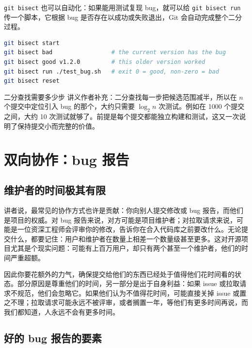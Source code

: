 \documentclass[a4paper]{article}
\begin{document}
\texttt{git bisect} 也可以自动化：如果能用测试复现 bug，就可以给 \texttt{git bisect run} 传一个脚本，它根据 bug 是否存在以成功或失败退出，Git 会自动完成整个二分过程。

\begin{lstlisting}[language=bash]
git bisect start
git bisect bad                 # the current version has the bug
git bisect good v1.2.0         # this older version worked
git bisect run ./test_bug.sh   # exit 0 = good, non-zero = bad
git bisect reset
\end{lstlisting}

\begin{knowledgebox}{二分查找需要多少步}
讲义作者补充：二分查找每一步把候选范围减半，所以在 $n$ 个提交中定位引入 bug 的那个，大约只需要 $\log_2 n$ 次测试。例如在 1000 个提交之间，大约 10 次测试就够了。前提是每个提交都能独立构建和测试，这又一次说明了保持提交小而完整的价值。
\end{knowledgebox}

\section{双向协作：bug 报告}

\subsection{维护者的时间极其有限}

讲者说，最常见的协作方式也许是贡献：你向别人提交修改或 bug 报告，而他们是项目的权威。对 bug 报告来说，对方可能是项目维护者；对拉取请求来说，可能是一位资深工程师会评审你的修改，告诉你在合入代码库之前要改什么。无论提交什么，都要记住：用户和维护者在数量上相差一个数量级甚至更多。这对开源项目尤其是个现实问题：可能有上百万用户，却只有两个甚至一个维护者，他们的时间严重超额。

因此你要花额外的力气，确保提交给他们的东西已经处于值得他们花时间看的状态。部分原因是尊重他们的时间，另一部分是出于自身利益：如果 issue 或拉取请求不规范，他们会忽略它。如果他们认为不值得花时间，可能直接关掉 issue 或置之不理；拉取请求可能永远不被评审，或者搁置一年，等他们有更多时间再说，而我们都知道，人永远不会有更多时间。

\subsection{好的 bug 报告的要素}
\end{document}
